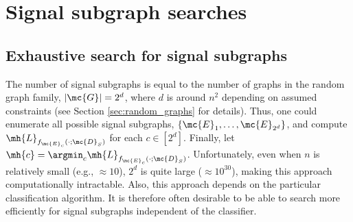 % 

\section{Signal subgraph searches} %
\label{sec:signal_subgraph_searches}


\subsection{Exhaustive search for signal subgraphs} %
\label{ssub:classifier_based_signal_subgraph_searches}

The number of signal subgraphs is equal to the number of graphs in the random graph family, $|\mc{G}|=2^d$, where $d$ is around $n^2$ depending on assumed constraints (see Section \ref{sec:random_graphs} for details).  Thus, one could enumerate all possible signal subgraphs, $\{\mc{E}_1,\ldots, \mc{E}_{2^d}\}$,
and compute $\mh{L}_{f_{\mc{E}_c}(\cdot; \mc{D}_S)}$ for each $c \in [2^d]$.  Finally, let $\mh{c}=\argmin_c \mh{L}_{f_{\mc{E}_c}(\cdot; \mc{D}_S)}$.  Unfortunately, even when $n$ is relatively small (e.g., $\approx 10$), $2^d$ is quite large ($\approx 10^{30}$), making this approach computationally intractable.  Also, this approach depends on the particular classification algorithm.  It is therefore often desirable to be able to search more efficiently for signal subgraphs independent of the classifier.

